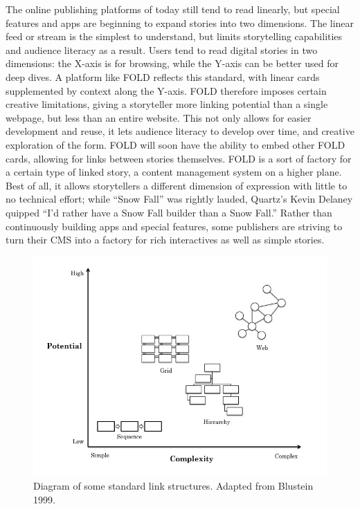 The online publishing platforms of today still tend to read linearly, but special features and apps are beginning to expand stories into two dimensions. The linear feed or stream is the simplest to understand, but limits storytelling capabilities and audience literacy as a result. Users tend to read digital stories in two dimensions: the X-axis is for browsing, while the Y-axis can be better used for deep dives. A platform like FOLD reflects this standard, with linear cards supplemented by context along the Y-axis. FOLD therefore imposes certain creative limitations, giving a storyteller more linking potential than a single webpage, but less than an entire website. This not only allows for easier development and reuse, it lets audience literacy to develop over time, and creative exploration of the form. FOLD will soon have the ability to embed other FOLD cards, allowing for links between stories themselves. FOLD is a sort of factory for a certain type of linked story, a content management system on a higher plane. Best of all, it allows storytellers a different dimension of expression with little to no technical effort; while ``Snow Fall'' was rightly lauded, Quartz's Kevin Delaney quipped ``I'd rather have a Snow Fall builder than a Snow Fall.''\autocite[36]{_innovation_2014} Rather than continuously building apps and special features, some publishers are striving to turn their CMS into a factory for rich interactives as well as simple stories.

\begin{figure}[ht]
\centering
\includegraphics[width=6.0in]{figures/linkstructures-custom}
\caption{Diagram of some standard link structures. Adapted from Blustein 1999.}
\label{fig:linkstructures-custom}
\end{figure}


